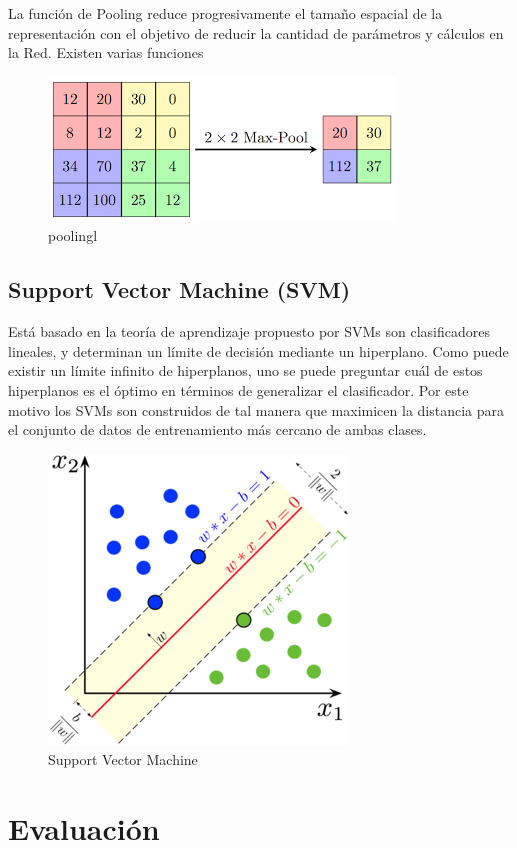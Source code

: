 \documentclass[a4paper,11pt]{report}
\begin{document}
La función de Pooling reduce progresivamente el tamaño espacial de la representación con el objetivo de reducir la cantidad de parámetros y cálculos en la Red. Existen varias funciones

\begin{figure}[h]
 \centering
  \includegraphics[scale=0.4]{pooling}
  \caption{poolingl}
  \label{fig:pooling}
\end{figure}

\subsection{Support Vector Machine (SVM)}
Está basado en la teoría de aprendizaje propuesto por SVMs son clasificadores lineales, y determinan un límite de decisión mediante un hiperplano. Como puede existir un límite infinito de hiperplanos, uno se puede preguntar cuál de estos hiperplanos es el óptimo en términos de generalizar el clasificador. Por este motivo los SVMs son construidos de tal manera que maximicen la distancia para el conjunto de datos de entrenamiento más cercano de ambas clases.


\begin{figure}[h]
	\centering
	\includegraphics[scale=2]{svm}
	\caption{Support Vector Machine}
	\label{fig:svm}
\end{figure}
\section{Evaluación }
\end{document}
